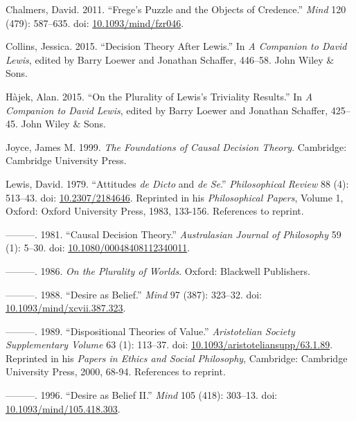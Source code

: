 \documentclass[
  11pt,
  letterpaper,
  DIV=11,
  numbers=noendperiod,
  twoside]{scrartcl}
\newlength{\cslhangindent}
\newenvironment{CSLReferences}[2] %
 {\begin{list}{}{%
  \setlength{\itemindent}{0pt}
  \setlength{\leftmargin}{0pt}
  \setlength{\parsep}{0pt}
  \ifodd #1
   \setlength{\leftmargin}{\cslhangindent}
   \setlength{\itemindent}{-1\cslhangindent}
  \fi
  \setlength{\itemsep}{#2\baselineskip}}}
 {\end{list}}
\begin{document}
\label{refs}
\begin{CSLReferences}{1}{0}
Chalmers, David. 2011. {``Frege's Puzzle and the Objects of Credence.''}
\emph{Mind} 120 (479): 587--635. doi:
\href{https://doi.org/10.1093/mind/fzr046}{10.1093/mind/fzr046}.

Collins, Jessica. 2015. {``Decision Theory After Lewis.''} In \emph{A
Companion to David Lewis}, edited by Barry Loewer and Jonathan Schaffer,
446--58. John Wiley \& Sons.

Hàjek, Alan. 2015. {``On the Plurality of Lewis's Triviality Results.''}
In \emph{A Companion to David Lewis}, edited by Barry Loewer and
Jonathan Schaffer, 425--45. John Wiley \& Sons.

Joyce, James M. 1999. \emph{The Foundations of Causal Decision Theory}.
Cambridge: Cambridge University Press.

Lewis, David. 1979. {``Attitudes \emph{de Dicto} and \emph{de Se}.''}
\emph{Philosophical Review} 88 (4): 513--43. doi:
\href{https://doi.org/10.2307/2184646}{10.2307/2184646}. Reprinted in
his \emph{Philosophical Papers}, Volume 1, Oxford: Oxford University
Press, 1983, 133-156. References to reprint.

---------. 1981. {``Causal Decision Theory.''} \emph{Australasian
Journal of Philosophy} 59 (1): 5--30. doi:
\href{https://doi.org/10.1080/00048408112340011}{10.1080/00048408112340011}.

---------. 1986. \emph{On the Plurality of Worlds}. Oxford: Blackwell
Publishers.

---------. 1988. {``Desire as Belief.''} \emph{Mind} 97 (387): 323--32.
doi:
\href{https://doi.org/10.1093/mind/xcvii.387.323}{10.1093/mind/xcvii.387.323}.

---------. 1989. {``Dispositional Theories of Value.''}
\emph{Aristotelian Society Supplementary Volume} 63 (1): 113--37. doi:
\href{https://doi.org/10.1093/aristoteliansupp/63.1.89}{10.1093/aristoteliansupp/63.1.89}.
Reprinted in his \emph{Papers in Ethics and Social Philosophy},
Cambridge: Cambridge University Press, 2000, 68-94. References to
reprint.

---------. 1996. {``Desire as Belief {II}.''} \emph{Mind} 105 (418):
303--13. doi:
\href{https://doi.org/10.1093/mind/105.418.303}{10.1093/mind/105.418.303}.


\end{CSLReferences}
\end{document}

